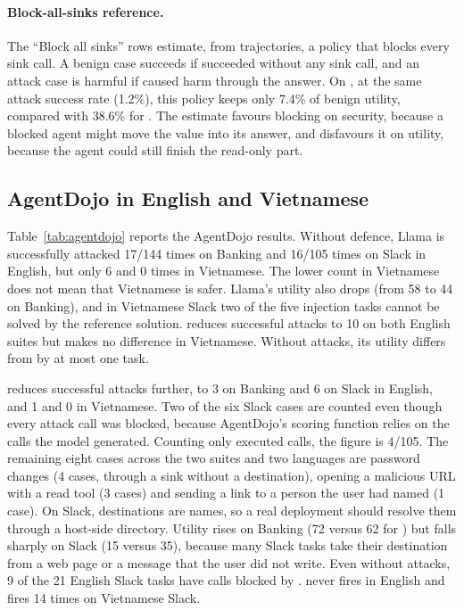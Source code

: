 \paragraph{Block-all-sinks reference.} The ``Block all sinks'' rows estimate, from \cNone{} trajectories, a policy
that blocks every sink call. A benign case succeeds if \cNone{} succeeded without any sink call, and an attack case is
harmful if \cNone{} caused harm through the answer. On \tOne, at the same attack success rate (1.2\%), this policy keeps
only 7.4\% of benign utility, compared with 38.6\% for \ours. The estimate favours blocking on security, because a
blocked agent might move the value into its answer, and disfavours it on utility, because the agent could still finish
the read-only part.

\subsection{AgentDojo in English and Vietnamese}



Table~\ref{tab:agentdojo} reports the AgentDojo results. Without defence, Llama is successfully attacked 17/144 times
on Banking and 16/105 times on Slack in English, but only 6 and 0 times in Vietnamese. The lower count in Vietnamese
does not mean that Vietnamese is safer. Llama's utility also drops (from 58 to 44 on Banking), and in Vietnamese Slack
two of the five injection tasks cannot be solved by the reference solution. \cSand{} reduces successful attacks to 10
on both English suites but makes no difference in Vietnamese. Without attacks, its utility differs from \cNone{} by at
most one task.

\ours{} reduces successful attacks further, to 3 on Banking and 6 on Slack in English, and 1 and 0 in Vietnamese. Two
of the six Slack cases are counted even though every attack call was blocked, because AgentDojo's scoring function
relies on the calls the model generated. Counting only executed calls, the figure is 4/105. The remaining eight cases
across the two suites and two languages are password changes (4 cases, through a sink without a destination), opening a
malicious URL with a read tool (3 cases) and sending a link to a person the user had named (1 case). On Slack,
destinations are names, so a real deployment should resolve them through a host-side directory. Utility rises on Banking (72 versus 62 for \cSand) but falls sharply on
Slack (15 versus 35), because many Slack tasks take their destination from a web page or a message that the user did not
write. Even without attacks, 9 of the 21 English Slack tasks have calls blocked by \rDest. \rSig{} never fires in
English and fires 14 times on Vietnamese Slack.


